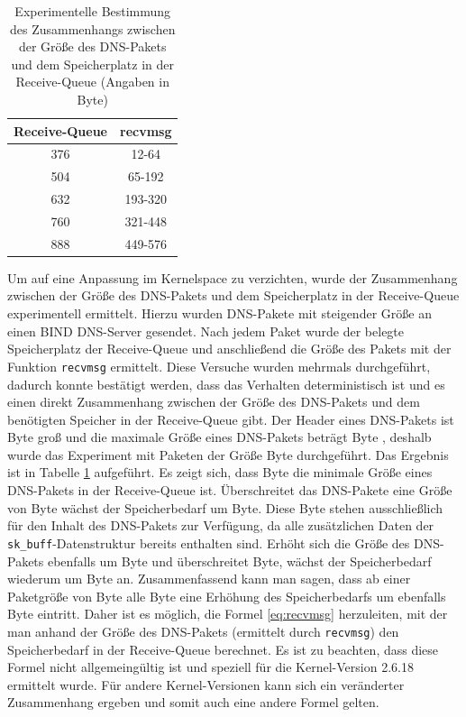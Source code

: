 \documentclass[a4paper, 12pt, BCOR10mm, DIV12, toc=bibliography, toc=listof, german]{scrbook}
\begin{document}
		\begin{table}
			\centering
			\begin{tabular}{|c|c|}\hline
				Receive-Queue & recvmsg \\\hline\hline
				376 & 12-64	\\
				504 & 65-192	\\
				632 & 193-320	\\
				760 & 321-448 \\
				888 &	449-576\\\hline
			\end{tabular}
			\caption{Experimentelle Bestimmung des Zusammenhangs zwischen der Größe des DNS-Pakets und dem
			Speicherplatz in der Receive-Queue (Angaben in Byte)}
			\label{tab:recvmsg}
		\end{table}

		Um auf eine Anpassung im Kernelspace zu verzichten, wurde der Zusammenhang zwischen der Größe
		des DNS-Pakets und dem Speicherplatz in der Receive-Queue experimentell ermittelt. Hierzu
		wurden DNS-Pakete mit steigender Größe an einen BIND DNS-Server gesendet. Nach jedem Paket wurde
		der belegte Speicherplatz der Receive-Queue und anschließend die Größe des Pakets mit
		der Funktion \texttt{recvmsg} ermittelt. Diese Versuche wurden mehrmals durchgeführt, dadurch
		konnte bestätigt werden, dass das Verhalten deterministisch ist und es einen direkt Zusammenhang
		zwischen der Größe des DNS-Pakets und dem benötigten Speicher in der Receive-Queue gibt. Der
		Header eines DNS-Pakets ist \unit[12]{Byte} groß und die maximale Größe eines DNS-Pakets beträgt
		\unit[512]{Byte}
		\cite{rfc1035}, deshalb wurde das Experiment mit Paketen der Größe \unit[12-576]{Byte} durchgeführt. Das
		Ergebnis ist in Tabelle \ref{tab:recvmsg} aufgeführt. Es zeigt sich, dass \unit[376]{Byte} die minimale
		Größe eines DNS-Pakets in der Receive-Queue ist. Überschreitet das DNS-Pakete eine Größe von
		\unit[64]{Byte} wächst der Speicherbedarf um \unit[128]{Byte}. Diese \unit[128]{Byte} stehen ausschließlich für den Inhalt
		des DNS-Pakets zur Verfügung, da alle zusätzlichen Daten der \texttt{sk\_buff}-Datenstruktur
		bereits enthalten sind. Erhöht sich die Größe des DNS-Pakets ebenfalls um \unit[128]{Byte} und
		überschreitet \unit[192]{Byte}, wächst der Speicherbedarf wiederum um \unit[128]{Byte} an. Zusammenfassend
		kann man sagen, dass ab einer Paketgröße von \unit[64]{Byte} alle \unit[128]{Byte} eine Erhöhung des
		Speicherbedarfs um ebenfalls \unit[128]{Byte} eintritt. Daher ist es möglich, die Formel \ref{eq:recvmsg}
		herzuleiten, mit der man anhand der Größe des DNS-Pakets (ermittelt durch \texttt{recvmsg}) den
		Speicherbedarf in der Receive-Queue berechnet. Es ist zu beachten, dass diese Formel nicht
		allgemeingültig ist und speziell für die Kernel-Version 2.6.18 ermittelt wurde. Für andere
		Kernel-Versionen kann sich ein veränderter Zusammenhang ergeben und somit auch eine andere
		Formel gelten.
\end{document}
